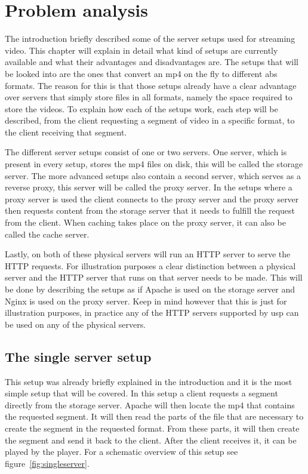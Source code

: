 \documentclass[twoside,openright]{uva-bachelor-thesis}
\begin{document}
\chapter{Problem analysis}\label{ch:problem}
The introduction briefly described some of the server setups used for streaming
video. This chapter will explain in detail what kind of setups are currently
available and what their advantages and disadvantages are. The setups that will
be looked into are the ones that convert an mp4 on the fly to different
\gls{abs} formats. The reason for this is that those setups already have a clear
advantage over servers that simply store files in all formats, namely the space
required to store the videos. To explain how each of the setups work, each step
will be described, from the client requesting a segment of video in a specific
format, to the client receiving that segment.

The different server setups consist of one or two servers. One server, which is
present in every setup, stores the mp4 files on disk, this will be called
the storage server. The more advanced setups also contain a second server, which
serves as a reverse proxy, this server will be called the proxy server. In the
setups where a proxy server is used the client connects to the proxy server and
the proxy server then requests content from the storage server that it needs
to fulfill the request from the client. When caching takes place on the proxy
server, it can also be called the cache server.

Lastly, on both of these physical servers will run an HTTP server to serve the
HTTP requests. For illustration purposes a clear distinction between a
physical server and the HTTP server that runs on that server needs to be made.
This will be done by describing the setups as if Apache is used on the storage
server and Nginx is used on the proxy server. Keep in mind however that this is
just for illustration purposes, in practice any of the HTTP servers supported by
\gls{usp} can be used on any of the physical servers.


\section{The single server setup}
This setup was already briefly explained in the introduction and it is the most
simple setup that will be covered. In this setup a client requests a segment
directly from the storage server. Apache will then locate the mp4 that contains
the requested segment. It will then read the parts of the file that are
necessary to create the segment in the requested format. From these parts, it
will then create the segment and send it back to the client. After the client
receives it, it can be played by the player. For a schematic overview of this
setup see figure~\vref{fig:singleserver}.
\end{document}
